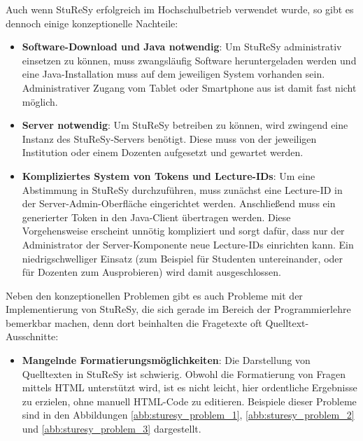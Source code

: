 Auch wenn StuReSy erfolgreich im Hochschulbetrieb verwendet wurde, so gibt es dennoch einige konzeptionelle Nachteile:
\begin{itemize}
    \item \textbf{Software-Download und Java notwendig}: Um StuReSy administrativ einsetzen zu können, muss zwangsläufig Software heruntergeladen werden und eine Java-Installation muss auf dem jeweiligen System vorhanden sein. Administrativer Zugang vom Tablet oder Smartphone aus ist damit fast nicht möglich.
    \item \textbf{Server notwendig}: Um StuReSy betreiben zu können, wird zwingend eine Instanz des StuReSy-Servers benötigt. Diese muss von der jeweiligen Institution oder einem Dozenten aufgesetzt und gewartet werden.
    \item \textbf{Kompliziertes System von Tokens und Lecture-IDs}: Um eine Abstimmung in StuReSy durchzuführen, muss zunächst eine Lecture-ID in der Server-Admin-Oberfläche eingerichtet werden. Anschließend muss ein generierter Token in den Java-Client übertragen werden. Diese Vorgehensweise erscheint unnötig kompliziert und sorgt dafür, dass nur der Administrator der Server-Komponente neue Lecture-IDs einrichten kann. Ein niedrigschwelliger Einsatz (zum Beispiel für Studenten untereinander, oder für Dozenten zum Ausprobieren) wird damit ausgeschlossen.
\end{itemize}

Neben den konzeptionellen Problemen gibt es auch Probleme mit der Implementierung von StuReSy, die sich gerade im Bereich der Programmierlehre bemerkbar machen, denn dort beinhalten die Fragetexte oft Quelltext-Ausschnitte:
\begin{itemize}
\item \textbf{Mangelnde Formatierungsmöglichkeiten}: Die Darstellung von Quelltexten in StuReSy ist schwierig. Obwohl die Formatierung von Fragen mittels HTML unterstützt wird, ist es nicht leicht, hier ordentliche Ergebnisse zu erzielen, ohne manuell HTML-Code zu editieren. Beispiele dieser Probleme sind in den Abbildungen \ref{abb:sturesy_problem_1}, \ref{abb:sturesy_problem_2} und \ref{abb:sturesy_problem_3} dargestellt.
\end{itemize}

